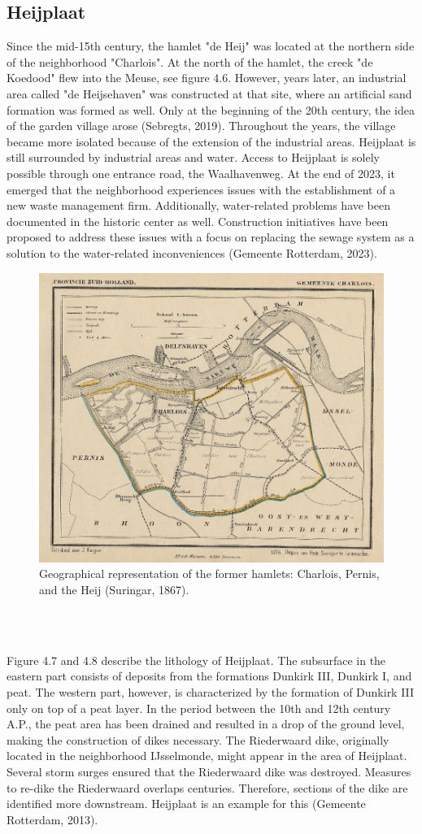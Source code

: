 \subsection{Heijplaat}
Since the mid-15th century, the hamlet "de Heij" was located at the northern side of the neighborhood "Charlois". At the north of the hamlet, the creek "de Koedood" flew into the Meuse, see figure 4.6. However, years later, an industrial area called "de Heijsehaven" was constructed at that site, where an artificial sand formation was formed as well. Only at the beginning of the 20th century, the idea of the garden village arose (Sebregts, 2019). Throughout the years, the village became more isolated because of the extension of the industrial areas. Heijplaat is still surrounded by industrial areas and water. Access to Heijplaat is solely possible through one entrance road, the Waalhavenweg. At the end of 2023, it emerged that the neighborhood experiences issues with the establishment of a new waste management firm. Additionally, water-related problems have been documented in the historic center as well. Construction initiatives have been proposed to address these issues with a focus on replacing the sewage system as a solution to the water-related inconveniences (Gemeente Rotterdam, 2023). \\
\begin{figure}[h]
    \centering
    \includegraphics[width=0.40\linewidth]{figures/heij/charloisdeheij.jpeg}
    \caption{Geographical representation of the former hamlets: Charlois, Pernis, and the Heij (Suringar, 1867).}
\end{figure}\\
\\
\newpage

Figure 4.7 and 4.8 describe the lithology of Heijplaat. The subsurface in the eastern part consists of deposits from the formations Dunkirk III, Dunkirk I, and peat. The western part, however, is characterized by the formation of Dunkirk III only on top of a peat layer. In the period between the 10th and 12th century A.P., the peat area has been drained and resulted in a drop of the ground level, making the construction of dikes necessary. The Riederwaard dike, originally located in the neighborhood IJsselmonde, might appear in the area of Heijplaat. Several storm surges ensured that the Riederwaard dike was destroyed. Measures to re-dike the Riederwaard overlaps centuries. Therefore, sections of the dike are identified more downstream. Heijplaat is an example for this (Gemeente Rotterdam, 2013). 

